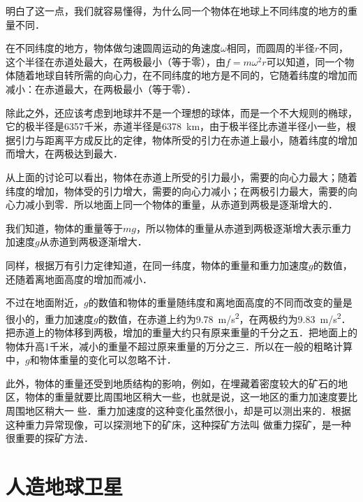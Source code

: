 明白了这一点，我们就容易懂得，为什么同一个物体在地球上不同纬度的地方的重量不同．

在不同纬度的地方，物体做匀速圆周运动的角速度$\omega$相同，而圆周的半径$r$不同，这个半径在赤道处最大，在两极最小（等于零），由$f=m\omega^2 r$可以知道，同一个物体随着地球自转所需的向心力，在不同纬度的地方是不同的，它随着纬度的增加而减小：在赤道最大，在两极最小（等于零）．

除此之外，还应该考虑到地球并不是一个理想的球体，而是一个不大规则的椭球，它的极半径是6357千米，赤道半径是\SI{6378}{km}，由于极半径比赤道半径小一些，根据引力与距离平方成反比的定律，物体所受的引力在赤道上最小，随着纬度的增加而增大，在两极达到最大．

从上面的讨论可以看出，物体在赤道上所受的引力最小，需要的向心力最大；随着纬度的增加，物体受的引力增大，需要的向心力减小；在两极引力最大，需要的向心力减小到零．所以地面上同一个物体的重量，从赤道到两极是逐渐增大的．

我们知道，物体的重量等于$mg$，所以物体的重量从赤道到两极逐渐增大表示重力加速度$g$从赤道到两极逐渐增大．

同样，根据万有引力定律知道，在同一纬度，物体的重量和重力加速度$g$的数值，还随着离地面高度的增加而减小．

不过在地面附近，$g$的数值和物体的重量随纬度和离地面高度的不同而改变的量是很小的，重力加速度$g$的数值，在赤道上约为\SI{9.78}{m/s^2}，在两极约为\SI{9.83}{m/s^2}．把赤道上的物体移到两极，增加的重量大约只有原来重量的千分之五．把地面上的物体升高1千米，减小的重量不超过原来重量的万分之三．所以在一般的粗略计算中，$g$和物体重量的变化可以忽略不计．

此外，物体的重量还受到地质结构的影响，例如，在埋藏着密度较大的矿石的地区，物体的重量就要比周围地区稍大一些，也就是说，这一地区的重力加速度要比周围地区稍大一
些．重力加速度的这种变化虽然很小，却是可以测出来的．根据这种重力异常现像，可以探测地下的矿床，这种探矿方法叫
做重力探矿，是一种很重要的探矿方法．
\newpage
\section{人造地球卫星}

